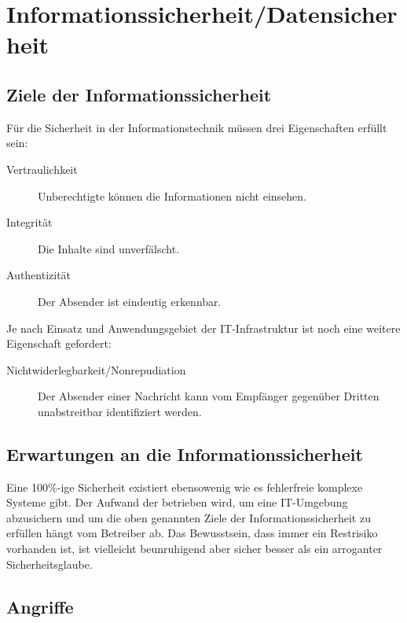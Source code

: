 \section{Informationssicherheit/Datensicherheit}
\label{sec:security}

\subsection{Ziele der Informationssicherheit}

Für die Sicherheit in der Informationstechnik müssen drei Eigenschaften erfüllt sein:

\begin{description}
    \item[Vertraulichkeit] Unberechtigte können die Informationen nicht einsehen.
    \item[Integrität] Die Inhalte sind unverfälscht.
    \item[Authentizität] Der Absender ist eindeutig erkennbar.
\end{description}

Je nach Einsatz und Anwendungsgebiet der IT-Infrastruktur ist noch eine
weitere Eigenschaft gefordert:

\begin{description}
    \item[Nichtwiderlegbarkeit/Nonrepudiation] Der Absender einer Nachricht
    kann vom Empfänger gegenüber Dritten unabstreitbar identifiziert werden.
\end{description}

\subsection{Erwartungen an die Informationssicherheit}

Eine 100\%-ige Sicherheit existiert ebensowenig wie es fehlerfreie komplexe
Systeme gibt. Der Aufwand der betrieben wird, um eine IT-Umgebung
abzusichern und um die oben genannten Ziele der Informationssicherheit
zu erfüllen hängt vom Betreiber ab. Das Bewusstsein, dass immer ein
Restrisiko vorhanden ist, ist vielleicht beunruhigend aber sicher besser
als ein arroganter Sicherheitsglaube.

\subsection{Angriffe}

